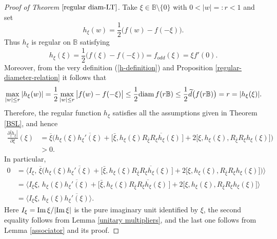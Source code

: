 \documentclass{amsart}
\theoremstyle{definition}
\theoremstyle{remark}
\numberwithin{equation}{section}
\begin{document}
\begin{proof}[Proof of Theorem $\ref{regular diam-LT}$]
 Take $\xi\in\mathbb B\setminus\{0\}$ with $0<|w|=:r<1$ and set
 \begin{equation}\label{h-definition}
   h_{\xi}(w)=\frac12 \Big(f(w)-f(-\xi)\Big).
 \end{equation}
 Thus $h_{\xi}$ is regular on $\mathbb B$ satisfying
 $$ h_{\xi}(\xi)=\frac12 \Big(f(\xi)-f(-\xi)\Big)=f_{odd}(\xi)=\xi f'(0).$$
 Moreover, from the very definition (\ref{h-definition}) and Proposition \ref{regular-diameter-relation} it follows that
 \begin{equation}\label{h-condition}
\max_{|w|\leq r}|h_{\xi}(w)|
=\frac12 \max_{|w|\leq r}\big |f(w)-f(-\xi)\big|
\leq\frac12 {\rm{diam}}\, f(r\mathbb B)
\leq\frac12 \widetilde{d}\big(f(r\mathbb B)\big)
=r
=|h_{\xi}(\xi)|.
\end{equation}
Therefore, the regular function $h_{\xi}$ satisfies all the assumptions given in Theorem \ref{BSL}, and hence
\begin{equation}
\begin{split}
\frac{\partial |h_{\xi}|}{\partial \xi}(\xi)
&=\overline{\xi}\Big(h_{\xi}(\xi)\overline{h_{\xi}'(\xi)}+\big[\bar{\xi}, h_{\xi}(\xi)\overline{R_{\bar{\xi}}R_{\xi}h_{\xi}(\xi)}\,\big]+2\big[\xi, h_{\xi}(\xi), R_{\bar{\xi}}R_{\xi}h_{\xi}(\xi)\big]\Big)
\\
&>0.
\end{split}
\end{equation}
In particular,
\begin{equation}\label{Key relation01}
\begin{split}
0&=\Big\langle I_{\xi},\, \overline{\xi}\Big(h_{\xi}(\xi)\overline{h_{\xi}'(\xi)}+\big[\bar{\xi}, h_{\xi}(\xi)\overline{R_{\bar{\xi}}R_{\xi}h_{\xi}(\xi)}\,\big]+2\big[\xi, h_{\xi}(\xi), R_{\bar{\xi}}R_{\xi}h_{\xi}(\xi)\big]\Big)\Big\rangle
\\
&=\Big\langle I_{\xi}\xi,\,  h_{\xi}(\xi)\overline{h_{\xi}'(\xi)}+\big[\bar{\xi}, h_{\xi}(\xi)\overline{R_{\bar{\xi}}R_{\xi}h_{\xi}(\xi)}\,\big]+2\big[\xi, h_{\xi}(\xi), R_{\bar{\xi}}R_{\xi}h_{\xi}(\xi)\big] \Big\rangle
\\
&=\Big\langle I_{\xi}\xi,\,  h_{\xi}(\xi)\overline{h_{\xi}'(\xi)}\Big\rangle.
\end{split}
\end{equation}
Here $I_{\xi}={\rm{Im}}\,\xi/|{\rm{Im}}\,\xi|$ is the pure imaginary unit identified by $\xi$, the second equality follows from  Lemma \ref{unitary multipliers}, and the last one follows from Lemma \ref{associator} and its proof.


\end{proof}
\end{document}
